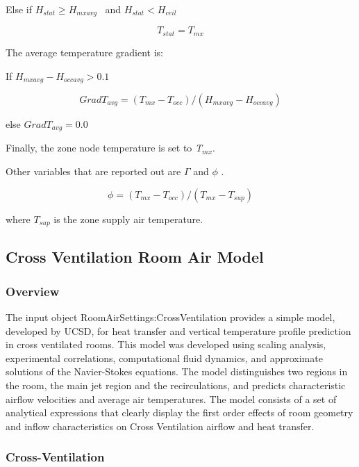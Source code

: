 Else if \({H_{stat}} \ge {H_{mxavg}}\) ~and \({H_{stat}} < {H_{ceil}}\)

\begin{equation}
{T_{stat}} = {T_{mx}}
\end{equation}

The average temperature gradient is:

If \({H_{mxavg}} - {H_{occavg}} > 0.1\)

\begin{equation}
Grad{T_{avg}} = ({T_{mx}} - {T_{occ}})/({H_{mxavg}} - {H_{occavg}})
\end{equation}

else \(Grad{T_{avg}} = 0.0\)

Finally, the zone node temperature is set to \emph{T\(_{mx}\)}.

Other variables that are reported out are \(\Gamma\) and \(\phi\) .

\begin{equation}
\phi  = ({T_{mx}} - {T_{occ}})/({T_{mx}} - {T_{sup}})
\end{equation}

where \({T_{sup}}\) is the zone supply air temperature.

\subsection{Cross Ventilation Room Air Model}\label{cross-ventilation-room-air-model}

\subsubsection{Overview}\label{overview-3-001}

The input object RoomAirSettings:CrossVentilation provides a simple model, developed by UCSD, for heat transfer and vertical temperature profile prediction in cross ventilated rooms. This model was developed using scaling analysis, experimental correlations, computational fluid dynamics, and approximate solutions of the Navier-Stokes equations. The model distinguishes two regions in the room, the main jet region and the recirculations, and predicts characteristic airflow velocities and average air temperatures. The model consists of a set of analytical expressions that clearly display the first order effects of room geometry and inflow characteristics on Cross Ventilation airflow and heat transfer.

\subsubsection{Cross-Ventilation}\label{cross-ventilation}

